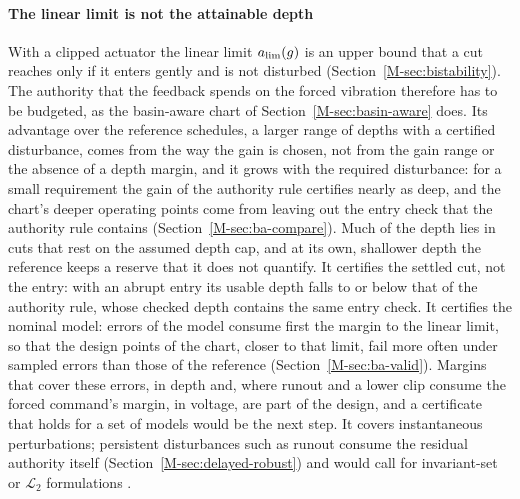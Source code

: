 \paragraph{The linear limit is not the attainable depth}
With a clipped actuator the linear limit $a_{\lim}(g)$ is an upper bound that a cut reaches only if it enters gently and is not disturbed (Section~\ref{M-sec:bistability}). The authority that the feedback spends on the forced vibration therefore has to be budgeted, as the basin-aware chart of Section~\ref{M-sec:basin-aware} does. Its advantage over the reference schedules, a larger range of depths with a certified disturbance, comes from the way the gain is chosen, not from the gain range or the absence of a depth margin, and it grows with the required disturbance: for a small requirement the gain of the authority rule certifies nearly as deep, and the chart's deeper operating points come from leaving out the entry check that the authority rule contains (Section~\ref{M-sec:ba-compare}). Much of the depth lies in cuts that rest on the assumed depth cap, and at its own, shallower depth the reference keeps a reserve that it does not quantify. It certifies the settled cut, not the entry: with an abrupt entry its usable depth falls to or below that of the authority rule, whose checked depth contains the same entry check. It certifies the nominal model: errors of the model consume first the margin to the linear limit, so that the design points of the chart, closer to that limit, fail more often under sampled errors than those of the reference (Section~\ref{M-sec:ba-valid}). Margins that cover these errors, in depth and, where runout and a lower clip consume the forced command's margin, in voltage, are part of the design, and a certificate that holds for a set of models would be the next step. It covers instantaneous perturbations; persistent disturbances such as runout consume the residual authority itself (Section~\ref{M-sec:delayed-robust}) and would call for invariant-set or $\mathcal L_2$ formulations \citep{hu2002disturbance,fang2004l2}.

